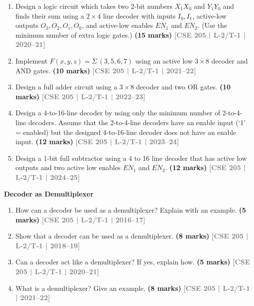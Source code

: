\documentclass[12pt,a4paper]{article}
\newcommand{\yr}[1]{\hfill\textcolor{gray}{\small\textbf{[#1]}}}
\newcommand{\mk}[1]{\textcolor{orange!70!black}{\small\textbf{(#1 marks)}}}
\newcommand{\subtopic}[2]{%
  \vspace{10pt}
  \noindent\begin{tcolorbox}[colback=#1!8,colframe=#1,boxrule=0.6pt,arc=4pt,
    left=6pt,right=6pt,top=4pt,bottom=4pt]
    \small\bfseries\textcolor{#1}{#2}
  \end{tcolorbox}
  \vspace{2pt}
}
\begin{document}
\begin{enumerate}
\item Design a logic circuit which takes two 2-bit numbers $X_1X_0$ and $Y_1Y_0$ and finds their sum using a $2\times4$ line decoder with inputs $I_0, I_1$, active-low outputs $O_3, O_2, O_1, O_0$, and active-low enables $\overline{EN_1}$ and $\overline{EN_2}$. (Use the minimum number of extra logic gates.)
\mk{15} \yr{CSE 205 | L-2/T-1 | 2020--21}

\item Implement $F(x, y, z) = \Sigma\,(3, 5, 6, 7)$ using an active low $3 \times 8$ decoder and AND gates.
\mk{10} \yr{CSE 205 | L-2/T-1 | 2021--22}

\item Design a full adder circuit using a $3 \times 8$ decoder and two OR gates.
\mk{10} \yr{CSE 205 | L-2/T-1 | 2022--23}

\item Design a 4-to-16-line decoder by using only the minimum number of 2-to-4-line decoders. Assume that the 2-to-4-line decoders have an enable input (`1' = enabled) but the designed 4-to-16-line decoder does not have an enable input.
\mk{12} \yr{CSE 205 | L-2/T-1 | 2023--24}

\item Design a 1-bit full subtractor using a 4 to 16 line decoder that has active low outputs and two active low enables $\overline{EN_1}$ and $\overline{EN_2}$.
\mk{12} \yr{CSE 205 | L-2/T-1 | 2024--25}

\end{enumerate}

\subtopic{cD}{Decoder as Demultiplexer}
\label{sub:s4-demux}

\begin{enumerate}
  

\item How can a decoder be used as a demultiplexer? Explain with an example.
\mk{5} \yr{CSE 205 | L-2/T-1 | 2016--17}

\item Show that a decoder can be used as a demultiplexer.
\mk{8} \yr{CSE 205 | L-2/T-1 | 2018--19}

\item Can a decoder act like a demultiplexer? If yes, explain how.
\mk{5} \yr{CSE 205 | L-2/T-1 | 2020--21}

\item What is a demultiplexer? Give an example.
\mk{8} \yr{CSE 205 | L-2/T-1 | 2021--22}


\end{enumerate}
\end{document}

